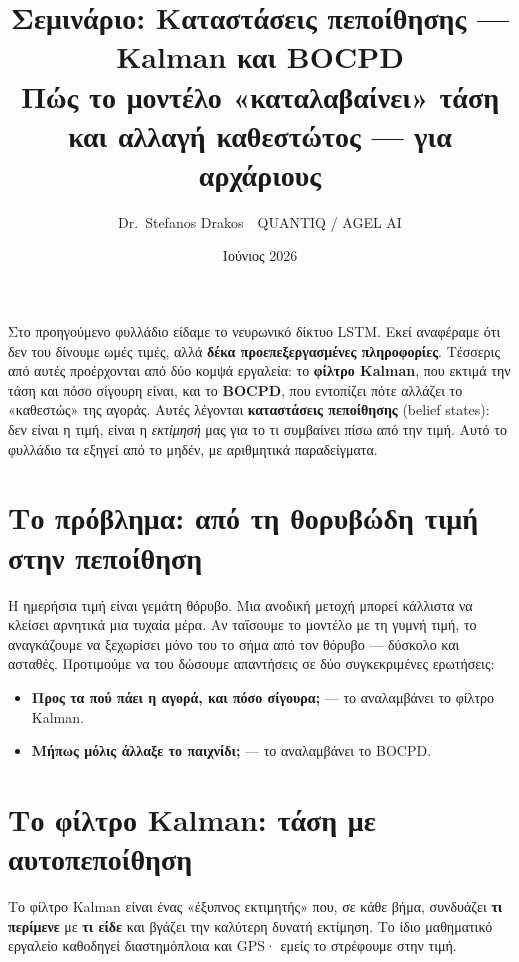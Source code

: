 \documentclass[11pt]{article}
\title{\textbf{\sffamily Σεμινάριο: Καταστάσεις πεποίθησης --- Kalman και BOCPD}\\[3pt]
\large Πώς το μοντέλο «καταλαβαίνει» τάση και αλλαγή καθεστώτος --- για αρχάριους}
\author{Dr.\ Stefanos Drakos \,\textemdash\, QUANTIQ / AGEL AI}
\date{Ιούνιος 2026}
\begin{document}
\maketitle\thispagestyle{empty}

\noindent
Στο προηγούμενο φυλλάδιο είδαμε το νευρωνικό δίκτυο LSTM. Εκεί αναφέραμε ότι δεν του δίνουμε ωμές
τιμές, αλλά \textbf{δέκα προεπεξεργασμένες πληροφορίες}. Τέσσερις από αυτές προέρχονται από δύο κομψά
εργαλεία: το \textbf{φίλτρο Kalman}, που εκτιμά την τάση και πόσο σίγουρη είναι, και το \textbf{BOCPD},
που εντοπίζει πότε αλλάζει το «καθεστώς» της αγοράς. Αυτές λέγονται \textbf{καταστάσεις πεποίθησης}
(belief states): δεν είναι η τιμή, είναι η \emph{εκτίμησή} μας για το τι συμβαίνει πίσω από την τιμή.
Αυτό το φυλλάδιο τα εξηγεί από το μηδέν, με αριθμητικά παραδείγματα.

\section{Το πρόβλημα: από τη θορυβώδη τιμή στην πεποίθηση}

Η ημερήσια τιμή είναι γεμάτη θόρυβο. Μια ανοδική μετοχή μπορεί κάλλιστα να κλείσει αρνητικά μια τυχαία
μέρα. Αν ταΐσουμε το μοντέλο με τη γυμνή τιμή, το αναγκάζουμε να ξεχωρίσει μόνο του το σήμα από τον
θόρυβο --- δύσκολο και ασταθές. Προτιμούμε να του δώσουμε απαντήσεις σε δύο συγκεκριμένες ερωτήσεις:
\begin{itemize}[nosep,leftmargin=1.4em]
\item \textbf{Προς τα πού πάει η αγορά, και πόσο σίγουρα;} --- το αναλαμβάνει το φίλτρο Kalman.
\item \textbf{Μήπως μόλις άλλαξε το παιχνίδι;} --- το αναλαμβάνει το BOCPD.
\end{itemize}

\section{Το φίλτρο Kalman: τάση με αυτοπεποίθηση}

Το φίλτρο Kalman είναι ένας «έξυπνος εκτιμητής» που, σε κάθε βήμα, συνδυάζει \textbf{τι περίμενε} με
\textbf{τι είδε} και βγάζει την καλύτερη δυνατή εκτίμηση. Το ίδιο μαθηματικό εργαλείο καθοδηγεί
διαστημόπλοια και GPS· εμείς το στρέφουμε στην τιμή.
\end{document}
